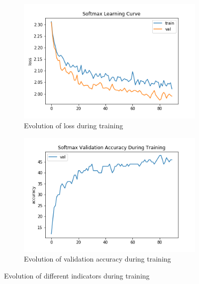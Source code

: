 

\begin{figure}[h!]
  \begin{center}
    \begin{subfigure}[t]{0.49\linewidth}
      \centering
      \includegraphics[width=\linewidth]{../code/assignment/2_pytorch/twolayernn_lossvstrain.png}
      \caption{Evolution of loss during training}
    \end{subfigure}
    \begin{subfigure}[t]{0.49\linewidth}
      \centering
      \includegraphics[width=\linewidth]{../code/assignment/2_pytorch/twolayernn_valaccuracy.png}
      \caption{Evolution of validation accuracy during training}
    \end{subfigure}
    \caption{Evolution of different indicators during training}
  \end{center}
\end{figure}

